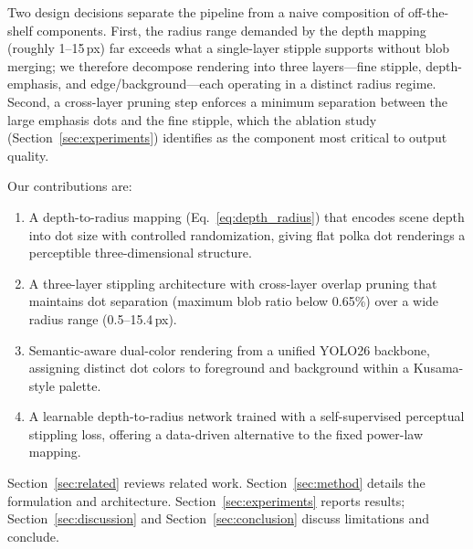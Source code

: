 Two design decisions separate the pipeline from a naive composition
of off-the-shelf components. First, the radius range demanded by the
depth mapping (roughly 1--15\,px) far exceeds what a single-layer
stipple supports without blob merging; we therefore decompose
rendering into three layers---fine stipple, depth-emphasis, and
edge/background---each operating in a distinct radius regime. Second,
a cross-layer pruning step enforces a minimum separation between the
large emphasis dots and the fine stipple, which the ablation study
(Section~\ref{sec:experiments}) identifies as the component most
critical to output quality.

Our contributions are:
\begin{enumerate}
    \item A depth-to-radius mapping (Eq.~\ref{eq:depth_radius}) that
    encodes scene depth into dot size with controlled randomization,
    giving flat polka dot renderings a perceptible
    three-dimensional structure.
    \item A three-layer stippling architecture with cross-layer
    overlap pruning that maintains dot separation (maximum blob
    ratio below 0.65\%) over a wide radius range (0.5--15.4\,px).
    \item Semantic-aware dual-color rendering from a unified YOLO26
    backbone, assigning distinct dot colors to foreground and
    background within a Kusama-style palette.
    \item A learnable depth-to-radius network trained with a
    self-supervised perceptual stippling loss, offering a data-driven
    alternative to the fixed power-law mapping.
\end{enumerate}

Section~\ref{sec:related} reviews related work.
Section~\ref{sec:method} details the formulation and architecture.
Section~\ref{sec:experiments} reports results;
Section~\ref{sec:discussion} and Section~\ref{sec:conclusion} discuss
limitations and conclude.
